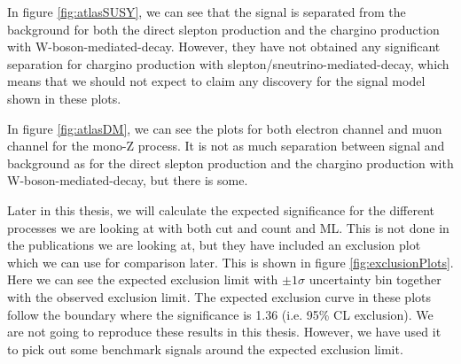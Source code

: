 In figure \ref{fig:atlasSUSY}, we can see that the signal is separated from the background for both the direct slepton production and the chargino production with W-boson-mediated-decay. However, they have not obtained any significant separation for chargino production with slepton/sneutrino-mediated-decay, which means that we should not expect to claim any discovery for the signal model shown in these plots. 

In figure \ref{fig:atlasDM}, we can see the plots for both electron channel and muon channel for the mono-Z process. It is not as much separation between signal and background as for the direct slepton production and the chargino production with W-boson-mediated-decay, but there is some. 

Later in this thesis, we will calculate the expected significance for the different processes we are looking at with both cut and count and ML. This is not done in the publications we are looking at, but they have included an exclusion plot which we can use for comparison later. This is shown in figure \ref{fig:exclusionPlots}. Here we can see the expected exclusion limit with $\pm1\sigma$ uncertainty bin together with the observed exclusion limit. The expected exclusion curve in these plots follow the boundary where the significance is 1.36 (i.e. 95\% CL exclusion). We are not going to reproduce these results in this thesis. However, we have used it to pick out some benchmark signals around the expected exclusion limit. 

